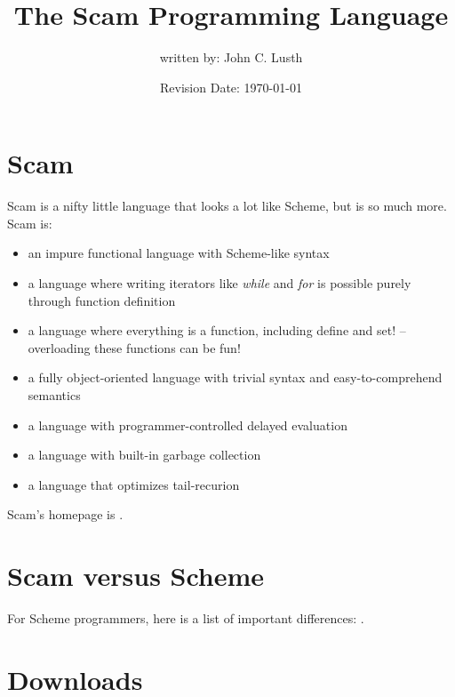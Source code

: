 \documentclass{article}
\title{The Scam Programming Language}
\author{written by: John C. Lusth}
\date{Revision Date: \today}
\begin{document}
\maketitle

\W\htmlrule

\W\section{}

\section{Scam}

Scam is a nifty little language
that looks a lot like Scheme, but is so much more.
Scam is:

\begin{itemize}
    \item
        an impure functional language with Scheme-like syntax
    \item
        a language where writing iterators like {\it while} and {\it for}
        is possible purely through function definition
    \item
        a language where everything is a function, including define and set!
        -- overloading these functions can be fun!
    \item
        a fully object-oriented language with trivial syntax and
        easy-to-comprehend semantics
    \item
        a language with programmer-controlled delayed
        evaluation
    \item
        a language with built-in garbage collection
    \item
        a language that optimizes tail-recurion
\end{itemize}

Scam's homepage is 
.

\section*{Scam versus Scheme}

For Scheme programmers, here is a list of important
differences: .

\section*{Downloads}
\end{document}
